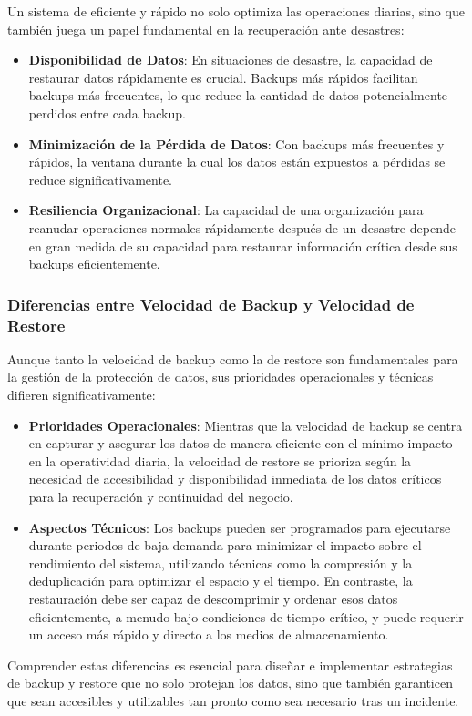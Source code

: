 Un sistema de eficiente y rápido no solo optimiza las operaciones diarias, sino que también juega un papel fundamental en la recuperación ante desastres:
\begin{itemize}
    \item \textbf{Disponibilidad de Datos}: En situaciones de desastre, la capacidad de restaurar datos rápidamente es crucial. Backups más rápidos facilitan backups más frecuentes, lo que reduce la cantidad de datos potencialmente perdidos entre cada backup.
    \item \textbf{Minimización de la Pérdida de Datos}: Con backups más frecuentes y rápidos, la ventana durante la cual los datos están expuestos a pérdidas se reduce significativamente.
    \item \textbf{Resiliencia Organizacional}: La capacidad de una organización para reanudar operaciones normales rápidamente después de un desastre depende en gran medida de su capacidad para restaurar información crítica desde sus backups eficientemente.
\end{itemize}


\subsubsection{Diferencias entre Velocidad de Backup y Velocidad de Restore}

Aunque tanto la velocidad de backup como la de restore son fundamentales para la gestión de la protección de datos, sus prioridades operacionales y técnicas difieren significativamente:

\begin{itemize}
    \item \textbf{Prioridades Operacionales}: Mientras que la velocidad de backup se centra en capturar y asegurar los datos de manera eficiente con el mínimo impacto en la operatividad diaria, la velocidad de restore se prioriza según la necesidad de accesibilidad y disponibilidad inmediata de los datos críticos para la recuperación y continuidad del negocio.
    \item \textbf{Aspectos Técnicos}: Los backups pueden ser programados para ejecutarse durante periodos de baja demanda para minimizar el impacto sobre el rendimiento del sistema, utilizando técnicas como la compresión y la deduplicación para optimizar el espacio y el tiempo. En contraste, la restauración debe ser capaz de descomprimir y ordenar esos datos eficientemente, a menudo bajo condiciones de tiempo crítico, y puede requerir un acceso más rápido y directo a los medios de almacenamiento.
\end{itemize}

Comprender estas diferencias es esencial para diseñar e implementar estrategias de backup y restore que no solo protejan los datos, sino que también garanticen que sean accesibles y utilizables tan pronto como sea necesario tras un incidente.
